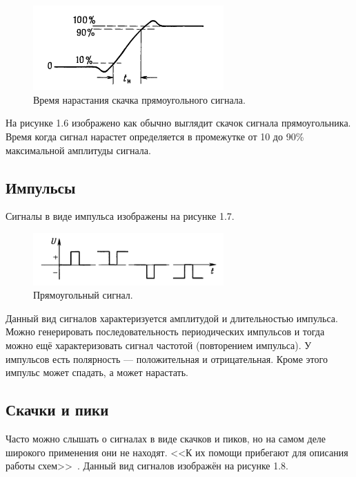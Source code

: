 	\begin{figure}[H]
    \centering
    \includegraphics[width=0.65\textwidth]{../image/s_p_t.png}
    \caption{Время нарастания скачка прямоугольного сигнала.}
	\end{figure}
	
На рисунке 1.6 изображено как обычно выглядит скачок сигнала прямоугольника. Время когда сигнал нарастет определяется в промежутке от 10 до 90\% максимальной амплитуды сигнала.

\subsection{Импульсы}
Сигналы в виде импульса изображены на рисунке 1.7.

	\begin{figure}[H]
    \centering
    \includegraphics[width=0.65\textwidth]{../image/s_i.png}
    \caption{Прямоугольный сигнал.}
	\end{figure}
	
Данный вид сигналов характеризуется амплитудой и длительностью импульса. Можно генерировать последовательность периодических импульсов и тогда можно ещё характеризовать сигнал частотой (повторением импульса). У импульсов есть полярность --- положительная и отрицательная. Кроме этого импульс может спадать, а может нарастать. 
	


\subsection{Скачки и пики}
Часто можно слышать о сигналах в виде скачков и пиков, но на самом деле широкого применения они не находят. <<К их помощи прибегают для описания работы схем>>~\cite{is1}. Данный вид сигналов изображён на рисунке 1.8.

